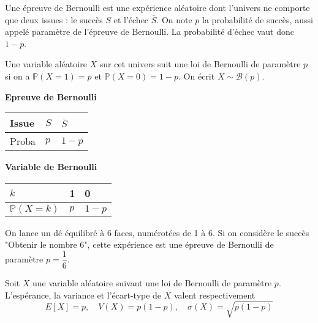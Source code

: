 \documentclass[11pt,fleqn, openany]{book} %
\begin{document}
\begin{definition}Une épreuve de Bernoulli est une expérience aléatoire dont l'univers ne comporte que deux issues : le succès $S$ et l'échec $\overline{S}$. On note $p$ la probabilité de succès, aussi appelé paramètre de l'épreuve de Bernoulli. La probabilité d'échec vaut donc $1-p$.

Une variable aléatoire $X$ sur cet univers suit une loi de Bernoulli de paramètre $p$ si on a $\mathbb{P}(X=1)=p$ et $\mathbb{P}(X=0)=1-p$. On écrit $X \sim \mathcal{B}(p)$.\end{definition}


\noindent\begin{minipage}{0.49\linewidth}
\begin{center}
\textbf{Epreuve de Bernoulli}
\renewcommand{\arraystretch}{1.2}
\begin{tabularx}{0.8\linewidth}{|X|X|X|}
\hline
Issue & $S$ & $\overline{S}$\\
\hline
Proba & $p$ & $1-p$\\
\hline
\end{tabularx}
\end{center}
\end{minipage}\hfill\begin{minipage}{0.49\linewidth}
\begin{center}
\textbf{Variable de Bernoulli}
\renewcommand{\arraystretch}{1.2}
\begin{tabularx}{0.8\linewidth}{|X|X|X|}
\hline
$k$ & 1 & 0\\
\hline
$\mathbb{P}(X=k)$ & $p$ & $1-p$\\
\hline
\end{tabularx}
\end{center}
\end{minipage}



\begin{example}On lance un dé équilibré à 6 faces, numérotées de 1 à 6. Si on considère le succès "Obtenir le nombre 6", cette expérience est une épreuve de Bernoulli de paramètre $p=\dfrac{1}{6}$. \end{example}

\begin{proposition}Soit $X$ une variable aléatoire suivant une loi de Bernoulli de paramètre $p$. L'espérance, la variance et l'écart-type de $X$ valent respectivement \[E[X]=p, \quad V(X)=p(1-p), \quad \sigma(X)=\sqrt{p(1-p)}\]\end{proposition}
\end{document}
